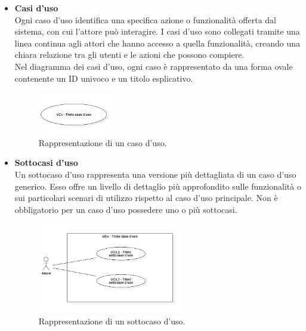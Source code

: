 \documentclass[10pt]{article}
\begin{document}
\begin{justify}
\begin{itemize}
            \item \textbf{Casi d'uso}\\
            Ogni caso d’uso identifica una specifica azione o funzionalità offerta dal sistema, con cui l’attore può interagire. I casi d'uso sono collegati tramite una linea continua agli attori che hanno accesso a quella funzionalità, creando una chiara relazione tra gli utenti e le azioni che possono compiere.\\
            Nel diagramma dei casi d’uso, ogni caso è rappresentato da una forma ovale contenente un ID univoco e un titolo esplicativo.
            \begin{figure}[H]
            \centering
            \includegraphics[width=0.30\textwidth]{UC.PNG}
            \caption{Rappresentazione di un caso d'uso.}
            \end{figure}

            \item \textbf{Sottocasi d'uso}\\
            Un sottocaso d’uso rappresenta una versione più dettagliata di un caso d’uso  generico. Esso offre un livello di dettaglio più approfondito sulle funzionalità o sui particolari scenari di utilizzo rispetto al caso d’uso principale. Non è obbligatorio per un caso d'uso possedere uno o più sottocasi.
            \begin{figure}[H]
            \centering
            \includegraphics[width=0.6\textwidth]{SottoUC.PNG}
            \caption{Rappresentazione di un sottocaso d'uso.}
            \end{figure}


\end{itemize}
\end{justify}
\end{document}
